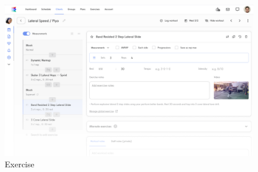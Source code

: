                 \begin{figure}[H]
                      \includegraphics[scale=0.5]{./Slike/trainer_client.png}
                      \centering
                      \caption{Exercise}
                      \label{fig:promjene}
                \end{figure}

